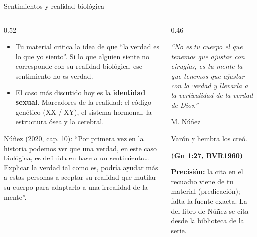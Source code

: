 \documentclass[hyperref={bookmarks=false},aspectratio=169]{beamer}
\newcommand{\fuente}[1]{\par\hfill{\upshape\bfseries\footnotesize\textcolor{azul}{#1}}}
\newcommand{\destacar}[1]{\textbf{\textcolor{azul}{#1}}}
\newcommand{\precision}[1]{{\footnotesize\color{gris}\textbf{Precisión:} #1}}
\begin{document}
\begin{frame}{Sentimientos y realidad biológica}
\begin{columns}[c,onlytextwidth]
\begin{column}{0.52\textwidth}\small
\begin{itemize}
\item Tu material critica la idea de que ``la verdad es lo que yo siento''. Si lo que alguien siente no corresponde con su realidad biológica, ese sentimiento no es verdad.
\item El caso más discutido hoy es la \destacar{identidad sexual}. Marcadores de la realidad: el código genético (XX / XY), el sistema hormonal, la estructura ósea y la cerebral.
\end{itemize}
\scriptsize Núñez (2020, cap. 10): ``Por primera vez en la historia podemos ver que una verdad, en este caso biológica, es definida en base a un sentimiento\ldots{} Explicar la verdad tal como es, podría ayudar más a estas personas a aceptar su realidad que mutilar su cuerpo para adaptarlo a una irrealidad de la mente''.
\end{column}
\begin{column}{0.46\textwidth}
\begin{tcolorbox}[colback=papiro,colframe=dorado,boxrule=1.2pt,arc=3pt]
\small\itshape ``No es tu cuerpo el que tenemos que ajustar con cirugías, es tu mente la que tenemos que ajustar con la verdad y llevarla a la verticalidad de la verdad de Dios.''\par\smallskip\upshape\hfill\scriptsize M. Núñez
\end{tcolorbox}
\begin{cita}Varón y hembra los creó.\fuente{(Gn 1:27, RVR1960)}\end{cita}
\precision{la cita en el recuadro viene de tu material (predicación); falta la fuente exacta. La del libro de Núñez se cita desde la biblioteca de la serie.}
\end{column}
\end{columns}
\end{frame}
\end{document}
